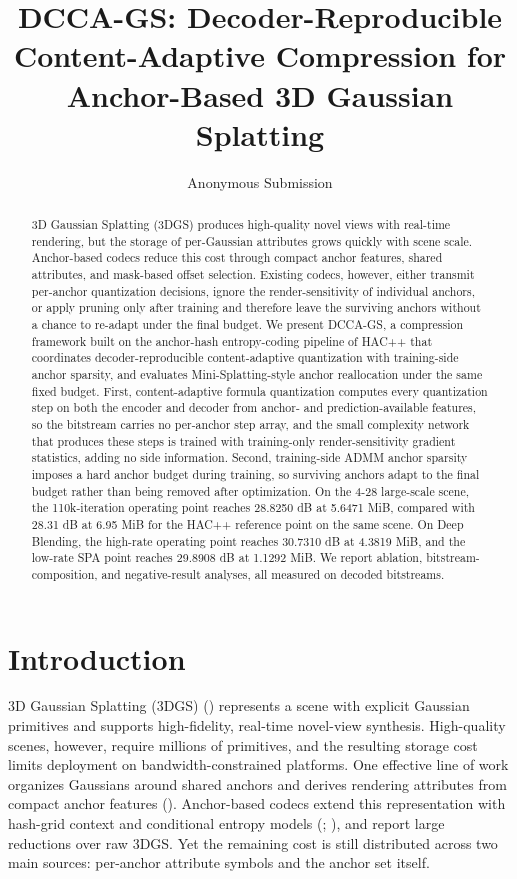 \documentclass{article}
\title{DCCA-GS: Decoder-Reproducible Content-Adaptive Compression for Anchor-Based 3D Gaussian Splatting}
\author{Anonymous Submission}
\date{}
\newcommand{\DCCA}{DCCA-GS}
\begin{document}
\maketitle

\begin{abstract}
3D Gaussian Splatting (3DGS) produces high-quality novel views with real-time rendering, but the storage of per-Gaussian attributes grows quickly with scene scale. Anchor-based codecs reduce this cost through compact anchor features, shared attributes, and mask-based offset selection. Existing codecs, however, either transmit per-anchor quantization decisions, ignore the render-sensitivity of individual anchors, or apply pruning only after training and therefore leave the surviving anchors without a chance to re-adapt under the final budget. We present \DCCA, a compression framework built on the anchor-hash entropy-coding pipeline of HAC++ that coordinates decoder-reproducible content-adaptive quantization with training-side anchor sparsity, and evaluates Mini-Splatting-style anchor reallocation under the same fixed budget. First, content-adaptive formula quantization computes every quantization step on both the encoder and decoder from anchor- and prediction-available features, so the bitstream carries no per-anchor step array, and the small complexity network that produces these steps is trained with training-only render-sensitivity gradient statistics, adding no side information. Second, training-side ADMM anchor sparsity imposes a hard anchor budget during training, so surviving anchors adapt to the final budget rather than being removed after optimization. On the 4-28 large-scale scene, the 110k-iteration operating point reaches 28.8250 dB at 5.6471 MiB, compared with 28.31 dB at 6.95 MiB for the HAC++ reference point on the same scene. On Deep Blending, the high-rate operating point reaches 30.7310 dB at 4.3819 MiB, and the low-rate SPA point reaches 29.8908 dB at 1.1292 MiB. We report ablation, bitstream-composition, and negative-result analyses, all measured on decoded bitstreams.
\end{abstract}

\section{Introduction}

3D Gaussian Splatting (3DGS) (\citet{kerbl2023}) represents a scene with explicit Gaussian primitives and supports high-fidelity, real-time novel-view synthesis. High-quality scenes, however, require millions of primitives, and the resulting storage cost limits deployment on bandwidth-constrained platforms. One effective line of work organizes Gaussians around shared anchors and derives rendering attributes from compact anchor features (\citet{lu2024}). Anchor-based codecs extend this representation with hash-grid context and conditional entropy models (\citet{chen2024}; \citet{chen2025}), and report large reductions over raw 3DGS. Yet the remaining cost is still distributed across two main sources: per-anchor attribute symbols and the anchor set itself.
\end{document}
